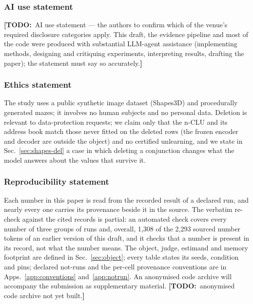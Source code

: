 \documentclass{article} %
\newcommand{\TODO}[1]{{\color{orange}\textbf{[TODO:}~#1\textbf{]}}}
\begin{document}
\subsubsection*{AI use statement}
\TODO{AI use statement --- the authors to confirm which of the venue's required disclosure categories
apply. This draft, the evidence pipeline and most of the code were produced with substantial LLM-agent
assistance (implementing methods, designing and critiquing experiments, interpreting results,
drafting the paper); the statement must say so accurately.}

\subsubsection*{Ethics statement}
The study uses a public synthetic image dataset (Shapes3D) and procedurally generated mazes; it
involves no human subjects and no personal data. Deletion is relevant to data-protection
requests; we claim only that the n-CLU and its address book match those never fitted on the deleted
rows (the frozen encoder and decoder are outside the object) and no certified unlearning, and
we state in Sec.~\ref{sec:shapes-del} a case in which deleting a conjunction changes what the
model answers about the values that survive it.

\subsubsection*{Reproducibility statement}
Each number in this paper is read from the recorded result of a declared run, and nearly every
one carries its provenance beside it in the source. The verbatim re-check against the cited records
is partial: an automated check covers every number of three groups of runs and, overall, 1,308 of %
the 2,293 sourced number tokens of an earlier version of this draft, and it checks that a number is %
present in its record, not what the number means. The object, judge, estimand and memory footprint are
defined in Sec.~\ref{sec:object}; every table states its seeds, condition and pins; declared
not-runs and the per-cell provenance conventions are in
Apps.~\ref{app:conventions} and~\ref{app:notrun}. An anonymised code archive will accompany the
submission as supplementary material. \TODO{anonymised code archive not yet built.}

\end{document}
